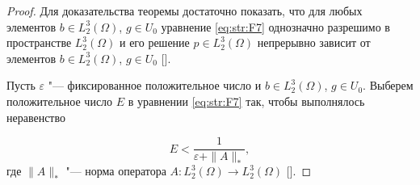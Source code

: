 \begin{proof}
Для доказательства теоремы достаточно показать, что для любых элементов $b\in L_{2}^{3} (\Omega)$, $g\in U_{0} $ уравнение \eqref{eq:str:F7} однозначно разрешимо в пространстве $L_{2}^{3} (\Omega)$ и его решение $p\in L_{2}^{3} (\Omega)$ непрерывно зависит от элементов $b\in L_{2}^{3} (\Omega)$, $g\in U_{0} $ [].



Пусть $\varepsilon $ "--- фиксированное положительное число и $b\in L_{2}^{3} (\Omega)$, $g\in U_{0} $.
Выберем положительное число $E$ в уравнении \eqref{eq:str:F7} так, чтобы выполнялось неравенство

\begin{equation} 
E<\frac{1}{\varepsilon + \| A\| _{*} },                                  \label{eq:str:F8}\end{equation}
где $ \| A \| _{*} $ "--- норма оператора $A \colon L_{2}^{3} (\Omega)\to L_{2}^{3} (\Omega)$ [].


\end{proof}
